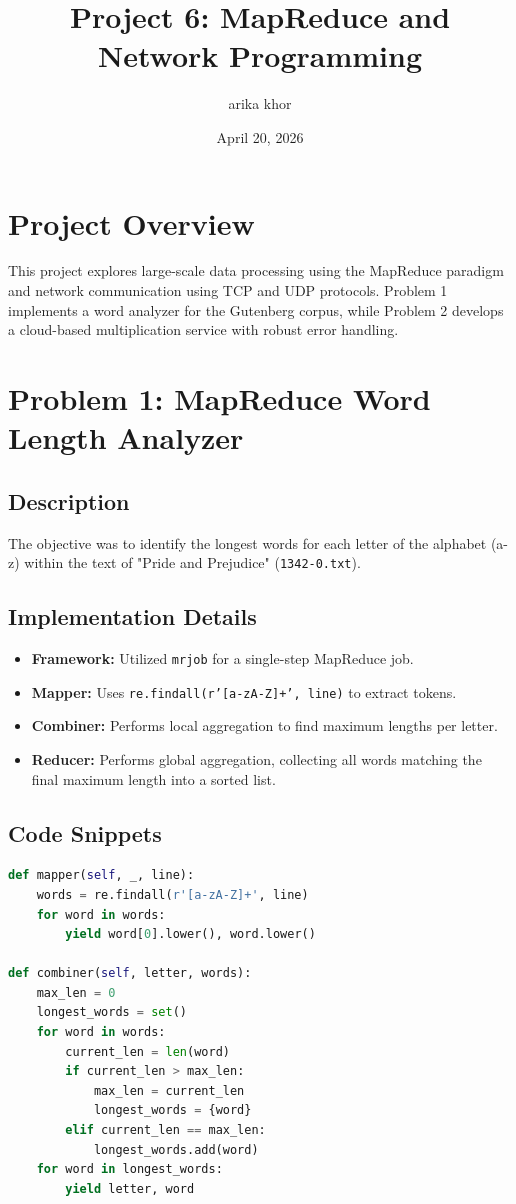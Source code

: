 \documentclass[11pt]{article}
\title{Project 6: MapReduce and Network Programming}
\author{arika khor}
\date{April 20, 2026}
\begin{document}
\maketitle
\tableofcontents
\newpage

\section{Project Overview}
This project explores large-scale data processing using the MapReduce paradigm and network communication using TCP and UDP protocols. Problem 1 implements a word analyzer for the Gutenberg corpus, while Problem 2 develops a cloud-based multiplication service with robust error handling.

\section{Problem 1: MapReduce Word Length Analyzer}

\subsection{Description}
The objective was to identify the longest words for each letter of the alphabet (a-z) within the text of "Pride and Prejudice" (\texttt{1342-0.txt}).

\subsection{Implementation Details}
\begin{itemize}
    \item \textbf{Framework:} Utilized \texttt{mrjob} for a single-step MapReduce job.
    \item \textbf{Mapper:} Uses \texttt{re.findall(r'[a-zA-Z]+', line)} to extract tokens.
    \item \textbf{Combiner:} Performs local aggregation to find maximum lengths per letter.
    \item \textbf{Reducer:} Performs global aggregation, collecting all words matching the final maximum length into a sorted list.
\end{itemize}

\subsection{Code Snippets}
\begin{lstlisting}[language=Python, caption=MapReduce Logic]
def mapper(self, _, line):
    words = re.findall(r'[a-zA-Z]+', line)
    for word in words:
        yield word[0].lower(), word.lower()

def combiner(self, letter, words):
    max_len = 0
    longest_words = set()
    for word in words:
        current_len = len(word)
        if current_len > max_len:
            max_len = current_len
            longest_words = {word}
        elif current_len == max_len:
            longest_words.add(word)
    for word in longest_words:
        yield letter, word
\end{lstlisting}
\end{document}
